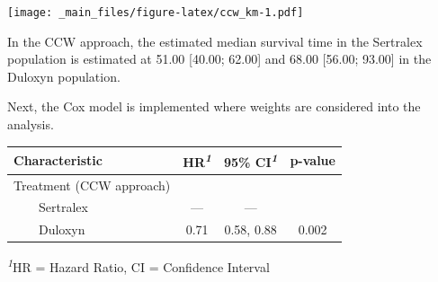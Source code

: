 \documentclass[
]{book}
\newenvironment{Shaded}{\begin{snugshade}}{\end{snugshade}}
\newcommand{\AttributeTok}[1]{\textcolor[rgb]{0.13,0.29,0.53}{#1}}
\newcommand{\CommentTok}[1]{\textcolor[rgb]{0.56,0.35,0.01}{\textit{#1}}}
\newcommand{\ConstantTok}[1]{\textcolor[rgb]{0.56,0.35,0.01}{#1}}
\newcommand{\FunctionTok}[1]{\textcolor[rgb]{0.13,0.29,0.53}{\textbf{#1}}}
\newcommand{\NormalTok}[1]{#1}
\newcommand{\OtherTok}[1]{\textcolor[rgb]{0.56,0.35,0.01}{#1}}
\newcommand{\SpecialCharTok}[1]{\textcolor[rgb]{0.81,0.36,0.00}{\textbf{#1}}}
\newcommand{\StringTok}[1]{\textcolor[rgb]{0.31,0.60,0.02}{#1}}
\begin{document}
\texttt{[image: \_main\_files/figure-latex/ccw\_km-1.pdf]}

In the CCW approach, the estimated median survival time in the Sertralex
population is estimated at 51.00 {[}40.00; 62.00{]} and 68.00 {[}56.00;
93.00{]} in the Duloxyn population.

Next, the Cox model is implemented where weights are considered into the
analysis.

\begin{Shaded}
\end{Shaded}

\begin{table}[!t]
\fontsize{12.0pt}{14.4pt}\selectfont
\begin{tabular*}{\linewidth}{@{\extracolsep{\fill}}lccc}
\toprule
\textbf{Characteristic} & \textbf{HR}\textsuperscript{\textit{1}} & \textbf{95\% CI}\textsuperscript{\textit{1}} & \textbf{p-value} \\ 
\midrule\addlinespace[2.5pt]
Treatment (CCW approach) &  &  &  \\ 
    Sertralex & — & — &  \\ 
    Duloxyn & 0.71 & 0.58, 0.88 & 0.002 \\ 
\bottomrule
\end{tabular*}
\begin{minipage}{\linewidth}
\textsuperscript{\textit{1}}HR = Hazard Ratio, CI = Confidence Interval\\
\end{minipage}
\end{table}
\end{document}
